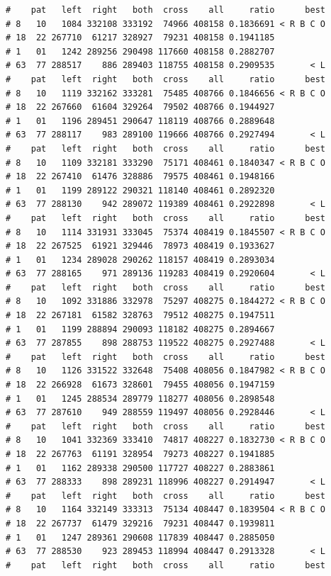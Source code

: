 \documentclass{article}\usepackage[]{graphicx}\usepackage[]{color}
\makeatletter
\newenvironment{kframe}{%
 \def\at@end@of@kframe{}%
 \ifinner\ifhmode%
  \def\at@end@of@kframe{\end{minipage}}%
  \begin{minipage}{\columnwidth}%
 \fi\fi%
 \def\FrameCommand##1{\hskip\@totalleftmargin \hskip-\fboxsep
 \colorbox{shadecolor}{##1}\hskip-\fboxsep
     \hskip-\linewidth \hskip-\@totalleftmargin \hskip\columnwidth}%
 \MakeFramed {\advance\hsize-\width
   \@totalleftmargin\z@ \linewidth\hsize
   \@setminipage}}%
 {\par\unskip\endMakeFramed%
 \at@end@of@kframe}
\newenvironment{knitrout}{}{} %
\makeatother
\begin{document}
\begin{knitrout}
\begin{kframe}
\begin{verbatim}
#    pat   left  right   both  cross    all     ratio      best
# 8   10   1084 332108 333192  74966 408158 0.1836691 < R B C O
# 18  22 267710  61217 328927  79231 408158 0.1941185          
# 1   01   1242 289256 290498 117660 408158 0.2882707          
# 63  77 288517    886 289403 118755 408158 0.2909535       < L
#    pat   left  right   both  cross    all     ratio      best
# 8   10   1119 332162 333281  75485 408766 0.1846656 < R B C O
# 18  22 267660  61604 329264  79502 408766 0.1944927          
# 1   01   1196 289451 290647 118119 408766 0.2889648          
# 63  77 288117    983 289100 119666 408766 0.2927494       < L
#    pat   left  right   both  cross    all     ratio      best
# 8   10   1109 332181 333290  75171 408461 0.1840347 < R B C O
# 18  22 267410  61476 328886  79575 408461 0.1948166          
# 1   01   1199 289122 290321 118140 408461 0.2892320          
# 63  77 288130    942 289072 119389 408461 0.2922898       < L
#    pat   left  right   both  cross    all     ratio      best
# 8   10   1114 331931 333045  75374 408419 0.1845507 < R B C O
# 18  22 267525  61921 329446  78973 408419 0.1933627          
# 1   01   1234 289028 290262 118157 408419 0.2893034          
# 63  77 288165    971 289136 119283 408419 0.2920604       < L
#    pat   left  right   both  cross    all     ratio      best
# 8   10   1092 331886 332978  75297 408275 0.1844272 < R B C O
# 18  22 267181  61582 328763  79512 408275 0.1947511          
# 1   01   1199 288894 290093 118182 408275 0.2894667          
# 63  77 287855    898 288753 119522 408275 0.2927488       < L
#    pat   left  right   both  cross    all     ratio      best
# 8   10   1126 331522 332648  75408 408056 0.1847982 < R B C O
# 18  22 266928  61673 328601  79455 408056 0.1947159          
# 1   01   1245 288534 289779 118277 408056 0.2898548          
# 63  77 287610    949 288559 119497 408056 0.2928446       < L
#    pat   left  right   both  cross    all     ratio      best
# 8   10   1041 332369 333410  74817 408227 0.1832730 < R B C O
# 18  22 267763  61191 328954  79273 408227 0.1941885          
# 1   01   1162 289338 290500 117727 408227 0.2883861          
# 63  77 288333    898 289231 118996 408227 0.2914947       < L
#    pat   left  right   both  cross    all     ratio      best
# 8   10   1164 332149 333313  75134 408447 0.1839504 < R B C O
# 18  22 267737  61479 329216  79231 408447 0.1939811          
# 1   01   1247 289361 290608 117839 408447 0.2885050          
# 63  77 288530    923 289453 118994 408447 0.2913328       < L
#    pat   left  right   both  cross    all     ratio      best

\end{verbatim}
\end{kframe}
\end{knitrout}
\end{document}
